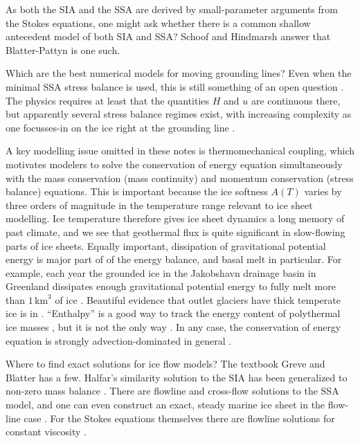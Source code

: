 \documentclass[letterpaper,final,12pt,reqno]{amsart}
\begin{document}
As both the SIA and the SSA are derived by small-parameter arguments from the Stokes equations, one might ask whether there is a common shallow antecedent model of both SIA and SSA?  Schoof and Hindmarsh \cite{SchoofHindmarsh} answer that Blatter-Pattyn is one such.

Which are the best numerical models for moving grounding lines?  Even when the minimal SSA stress balance is used, this is still something of an open question \cite{Goldbergetal2009,MISMIP2012,MISMIP3d2013,SchoofMarine1}.  The physics requires at least that the quantities $H$ and $u$ are continuous there, but apparently several stress balance regimes exist, with increasing complexity as one focusses-in on the ice right at the grounding line \cite{SchoofMarine2}.

A key modelling issue omitted in these notes is thermomechanical coupling, which motivates modelers to solve the conservation of energy equation simultaneously with the mass conservation (mass continuity) and momentum conservation (stress balance) equations.  This is important because the ice softness $A(T)$ varies by three orders of magnitude in the temperature range relevant to ice sheet modelling.  Ice temperature therefore gives ice sheet dynamics a long memory of past climate, and we see that geothermal flux is quite significant in slow-flowing parts of ice sheets.  Equally important, dissipation of gravitational potential energy is major part of of the energy balance, and basal melt in particular.  For example, each year the grounded ice in the Jakobshavn drainage basin in Greenland dissipates enough gravitational potential energy to fully melt more than $1\,\text{km}^3$ of ice \cite{AschwandenBuelerKhroulevBlatter}.  Beautiful evidence that outlet glaciers have thick temperate ice is in \cite{Luethietal2009}.  ``Enthalpy'' is a good way to track the energy content of polythermal ice masses \cite{AschwandenBuelerKhroulevBlatter}, but it is not the only way \cite{Greve}.  In any case, the conservation of energy equation is strongly advection-dominated in general \cite{BBL}.

Where to find exact solutions for ice flow models?  The textbook Greve and Blatter \cite{GreveBlatter2009} has a few.  Halfar's similarity solution to the SIA \cite{Halfar81,Halfar83} has been generalized to non-zero mass balance \cite{BLKCB}.  There are flowline \cite{Bodvardsson,vanderVeen83} and cross-flow \cite{SchoofStream} solutions to the SSA model, and one can even construct an exact, steady marine ice sheet in the flow-line case \cite{Bueler2014exactmarine}.  For the Stokes equations themselves there are flowline solutions for constant viscosity \cite{BaliseRaymond1985}.
\end{document}
